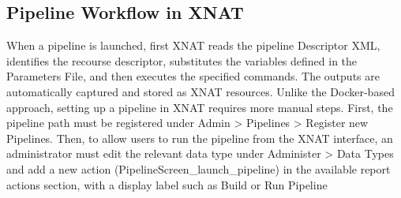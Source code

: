 \subsection{Pipeline Workflow in XNAT}
When a pipeline is launched, first XNAT reads the pipeline Descriptor XML, identifies the recourse descriptor, substitutes the variables defined in the Parameters File, and then executes the specified commands. The outputs are automatically captured and stored as XNAT resources.
Unlike the Docker-based approach, setting up a pipeline in XNAT requires more manual steps. First, the pipeline path must be registered under Admin > Pipelines > Register new Pipelines. Then, to allow users to run the pipeline from the XNAT interface, an administrator must edit the relevant data type under Administer > Data Types and add a new action (PipelineScreen\_launch\_pipeline) in the available report actions section, with a display label such as Build or Run Pipeline~\cite{installpipeline}
\normalsize



